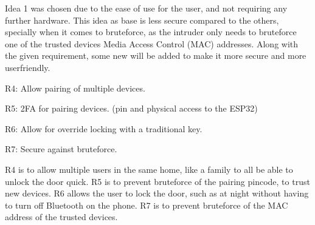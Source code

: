 Idea 1 was chosen due to the ease of use for the user, and not requiring any further hardware.
This idea as base is less secure compared to the others, specially when it comes to bruteforce, as the intruder only needs to bruteforce one of the trusted devices Media Access Control (MAC) addresses.
Along with the given requirement, some new will be added to make it more secure and more userfriendly.
\newline

R4: Allow pairing of multiple devices.

R5: 2FA for pairing devices. (pin and physical access to the ESP32)

R6: Allow for override locking with a traditional key.

R7: Secure against bruteforce.
\newline

R4 is to allow multiple users in the same home, like a family to all be able to unlock the door quick.
R5 is to prevent bruteforce of the pairing pincode, to trust new devices.
R6 allows the user to lock the door, such as at night without having to turn off Bluetooth on the phone.
R7 is to prevent bruteforce of the MAC address of the trusted devices.